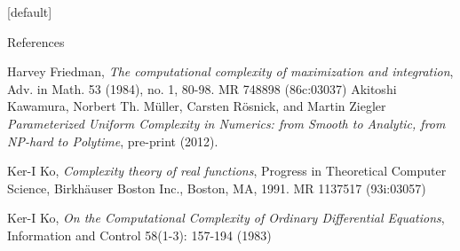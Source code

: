 \documentclass[xcolor=pdftex,dvipsnames,table]{beamer}
\begin{document}
{
\makeatletter %
    [default] 
    \def\beamer@entrycode{\vspace*{-\headheight}} 
\makeatother
{}
\begin{frame}{References}
\fontsize{6pt}{7.2}\color{white}\selectfont 
\nocite{*}
\def\newblock{}


\begin{thebibliography}{10}   

  \beamertemplatearticlebibitems
	Harvey Friedman,
    \newblock \emph{ The computational complexity of maximization and integration}, Adv. in Math. 53 (1984), no. 1, 80-98. MR 748898 (86c:03037)
  \beamertemplatearticlebibitems
	Akitoshi Kawamura, Norbert Th. M\"{u}ller, Carsten R\"{o}snick, and
Martin Ziegler
    \newblock \emph{Parameterized Uniform Complexity in Numerics:
from Smooth to Analytic, from NP-hard to Polytime}, pre-print (2012).

  \beamertemplatearticlebibitems
	Ker-I Ko,
    \newblock \emph{ Complexity theory of real functions}, Progress in Theoretical Computer Science, Birkh\"{a}user Boston Inc., Boston, MA, 1991.
MR 1137517 (93i:03057)

  \beamertemplatearticlebibitems
	Ker-I Ko,
    \newblock \emph{  On the Computational Complexity of Ordinary Differential Equations}, Information and Control 58(1-3): 157-194 (1983)



\end{thebibliography}
\end{frame}}
\end{document}
